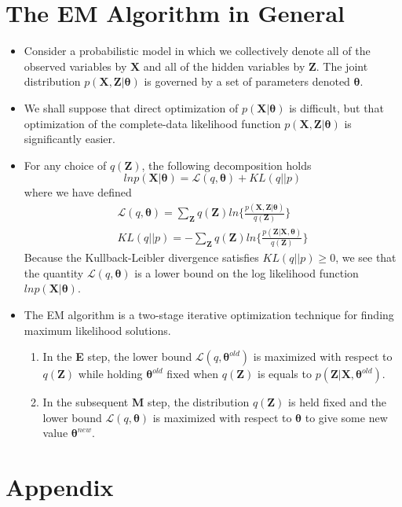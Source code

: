 \documentclass[12pt, a4paper]{article}
\begin{document}
    \section{The EM Algorithm in General}
    \begin{itemize}
        \item Consider a probabilistic model in which we collectively denote all of the observed
        variables by $\mathbf{X}$ and all of the hidden variables by $\mathbf{Z}$. The joint 
        distribution $p(\mathbf{X},\mathbf{Z}|\bm{\theta})$
        is governed by a set of parameters denoted $\bm{\theta}$.
        \item We shall suppose that direct optimization of $p(\mathbf{X}|\bm{\theta})$ 
        is difficult, but that optimization
        of the complete-data likelihood function $p(\mathbf{X},\mathbf{Z}|\bm{\theta})$ 
        is significantly easier. 
        \item For any choice of $q(\mathbf{Z})$, the following decomposition holds
        \begin{equation}
            lnp(\mathbf{X}|\bm{\theta})=\mathcal{L}(q,\bm{\theta})+KL(q||p)
        \end{equation}
        where we have defined
        \begin{align}
            \mathcal{L}(q,\bm{\theta})=\sum_{\mathbf{Z}}q(\mathbf{Z})ln\Big\{\frac
            {p(\mathbf{X},\mathbf{Z}|\bm{\theta})}{q(\mathbf{Z})}\Big\}\\
            KL(q||p)=-\sum_{\mathbf{Z}}q(\mathbf{Z})ln\Big\{\frac
            {p(\mathbf{Z}|\mathbf{X},\bm{\theta})}{q(\mathbf{Z})}\Big\}
        \end{align}
        Because the Kullback-Leibler divergence satisfies $KL(q||p)\ge 0$, we see that the quantity
        $\mathcal{L}(q,\bm{\theta})$ is a lower bound on the log
        likelihood function $lnp(\mathbf{X}|\bm{\theta})$.
        \item The EM algorithm is a two-stage iterative optimization technique for finding
        maximum likelihood solutions. 
        \begin{enumerate}
            \item In the \textbf{E} step, the
            lower bound $\mathcal{L}(q,\bm{\theta}^{old})$ is maximized with respect to 
            $q(\mathbf{Z})$ while holding $\bm{\theta}^{old}$ fixed when $q(\mathbf{Z})$ is
            equals to $p(\mathbf{Z}|\mathbf{X},\bm{\theta}^{old})$. 
            \item In the subsequent \textbf{M} step, the distribution $q(\mathbf{Z})$ is held 
            fixed and the lower bound $\mathcal{L}(q,\bm{\theta})$ is maximized with respect to 
            $\bm{\theta}$ to give some new value $\bm{\theta}^{new}$. 
        \end{enumerate}
    \end{itemize}
    \section{Appendix}
\end{document}
